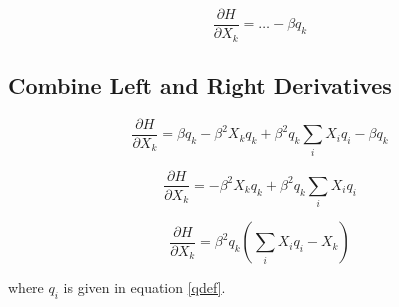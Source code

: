 \begin{equation}
    \frac{\partial H}{\partial X_{k}} = \ldots - \beta q_{k}
\label{rightd}
\end{equation}

\subsection{Combine Left and Right Derivatives}

\begin{displaymath}
    \frac{\partial H}{\partial X_{k}} = \beta q_{k} - \beta^{2} X_{k} q_{k} + \beta^{2} q_{k} \sum_{i}X_{i}q_{i} - \beta q_{k}
\end{displaymath}

\begin{displaymath}
    \frac{\partial H}{\partial X_{k}} = - \beta^{2}X_{k}q_{k} + \beta^{2}q_{k}\sum_{i}X_{i}q_{i}
\end{displaymath}

\begin{equation}
    \frac{\partial H}{\partial X_{k}} = \beta^{2}q_{k}\left(\sum_{i}X_{i}q_{i} - X_{k}\right)
\label{combd}
\end{equation}

\noindent where $q_{i}$ is given in equation \ref{qdef}.




